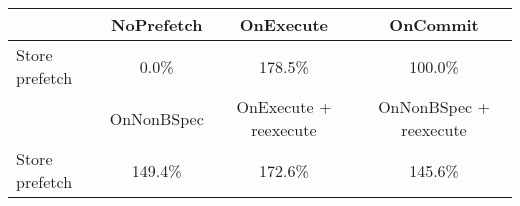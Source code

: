 \begin{tabular}{ l|ccc }
 & NoPrefetch & OnExecute & OnCommit\\ \hline
Store prefetch & 0.0\% & 178.5\% & 100.0\%\\ \hline
\hline
 & OnNonBSpec & OnExecute + reexecute & OnNonBSpec + reexecute\\ \hline
Store prefetch & 149.4\% & 172.6\% & 145.6\%\\ \hline
\end{tabular}

